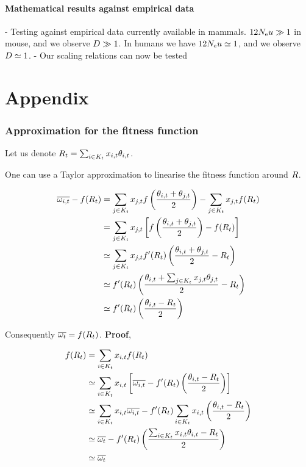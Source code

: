 \documentclass{article}
\begin{document}
\subsection*{Mathematical results against empirical data}
- Testing against empirical data currently available in mammals. $12 N_\mathrm{e} u \gg 1$ in mouse, and we observe $D \gg 1$. In humans we have $12 N_\mathrm{e} u \simeq 1$, and we observe $D \simeq 1$.
- Our scaling relations can now be tested 




\part*{Appendix}
\section*{Approximation for the fitness function}
Let us denote $R_{t} =\sum_{i  \in K_{t}} x_{i,t} \theta _{i,t}$.

One can use a Taylor approximation to linearise the fitness function around $R $.  

\begin{align}
    \overline{\omega_{i,t}} - f(R_{t} ) &=
    \sum_{j \in K_{t}} x_{j,t} f \left( \dfrac{\theta _{i,t} + \theta _{j,t}}{2} \right) - \sum_{j \in K_{t}} x_{j,t} f(R_{t} ) \\
    &=
    \sum_{j \in K_{t}} x_{j,t}  \left[ f \left( \dfrac{\theta _{i,t} + \theta _{j,t}}{2} \right) - f(R_{t} ) \right] \\
    &\simeq
    \sum_{j \in K_{t}} x_{j,t}  f'(R_{t} ) \left( \dfrac{\theta _{i,t} + \theta _{j,t}}{2} - R_{t}  \right) \\
    &\simeq
     f'(R_{t} ) \left( \dfrac{\theta _{i,t} + \sum_{j \in K_{t}} x_{j,t} \theta _{j,t}}{2} - R_{t}  \right) \\
     &\simeq
     f'(R_{t} ) \left( \dfrac{\theta _{i,t} - R_{t} }{2}\right) \\
\end{align}

Consequently $\overline{\omega_{t}} = f(R_{t} )$. \textbf{Proof},

\begin{align}
    f(R_{t} ) &= \sum_{i \in K_{t}} x_{i,t} f(R_{t} ) \\
    &\simeq \sum_{i \in K_{t}} x_{i,t} \left[ \overline{\omega_{i,t}} - f'(R_{t} ) \left( \dfrac{\theta _{i,t} - R_{t} }{2}\right) \right] \\
    &\simeq
    \sum_{i \in K_{t}} x_{i,t} \overline{\omega_{i,t}} - f'(R_{t} ) \sum_{i \in K_{t}} x_{i,t}  \left( \dfrac{\theta _{i,t} - R_{t} }{2}\right) \\
    &\simeq
     \overline{\omega_{t}} - f'(R_{t} )  \left( \dfrac{\sum_{i \in K_{t}} x_{i,t} \theta _{i,t} - R_{t} }{2}\right) \\
    &\simeq
     \overline{\omega_{t}}
\end{align}
\end{document}

